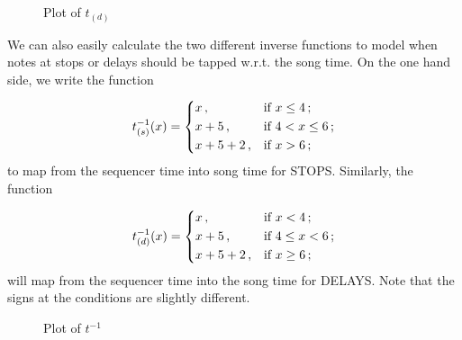 \documentclass[a4paper,9pt]{article}
\begin{document}
\begin{figure}[htpb]
	\centering

\caption{Plot of $t_{(d)}$ }
	\label{fig:songtime2seqtime}
\end{figure}

We can also easily  calculate the two different inverse functions to model when notes at stops or delays should be tapped w.r.t. the song time. On the one hand side, we write the function

    \begin{equation}
	    t^{-1}_{(s)}(x) =\begin{dcases}
		    x\,, &\text{if $ x \leq 4 $}\,;\\
		    x+5\,,& \text{if $ 4 < x \leq 6 $}\,;\\
		    x+5+2\,,& \text{if $ x > 6 $}\,;\\
	    \end{dcases}
	    \label{eq:tostops}
    \end{equation}
    to map from the sequencer time into song time for STOPS. Similarly, the function

    \begin{equation}
	    t^{-1}_{(d)}(x) =\begin{dcases}
		    x\,, &\text{if $ x < 4 $}\,;\\
		    x+5\,,& \text{if $ 4 \leq x < 6 $}\,;\\
		    x+5+2\,,& \text{if $ x \geq 6 $}\,;\\
	    \end{dcases}
	    \label{eq:todelays}
    \end{equation}
    will map from the sequencer time into the song time for DELAYS. Note that the signs at the conditions are slightly different.


\begin{figure}[htpb]
	\centering


\caption{Plot of $t^{-1}$ }
	\label{fig:seqtime2songtime}
\end{figure}
\end{document}
